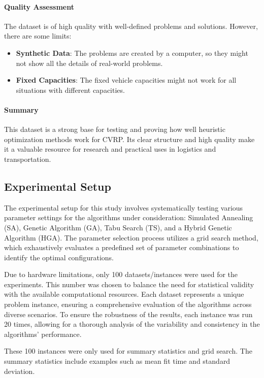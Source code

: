 \documentclass{article}
\begin{document}
    \paragraph{Quality Assessment}
    The dataset is of high quality with well-defined problems and solutions. However, there are some limits:
    \begin{itemize}
        \item \textbf{Synthetic Data}: The problems are created by a computer, so they might not show all the details of real-world problems.
        \item \textbf{Fixed Capacities}: The fixed vehicle capacities might not work for all situations with different capacities.
    \end{itemize}

    \paragraph{Summary}
    This dataset is a strong base for testing and proving how well heuristic optimization methods work for CVRP. Its clear structure and high quality make it a valuable resource for research and practical uses in logistics and transportation.

    \subsection{Experimental Setup}

    The experimental setup for this study involves systematically testing various parameter settings for the algorithms under consideration: Simulated Annealing (SA), Genetic Algorithm (GA), Tabu Search (TS), and a Hybrid Genetic Algorithm (HGA). The parameter selection process utilizes a grid search method, which exhaustively evaluates a predefined set of parameter combinations to identify the optimal configurations.

    Due to hardware limitations, only 100 datasets/instances were used for the experiments. This number was chosen to balance the need for statistical validity with the available computational resources. Each dataset represents a unique problem instance, ensuring a comprehensive evaluation of the algorithms across diverse scenarios. To ensure the robustness of the results, each instance was run 20 times, allowing for a thorough analysis of the variability and consistency in the algorithms’ performance.

    These 100 instances were only used for summary statistics and grid search. The summary statistics include examples such as mean fit time and standard deviation.
\end{document}
